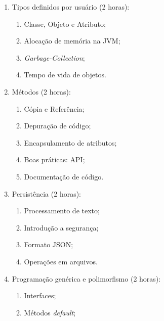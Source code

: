 \documentclass{article}
\begin{document}
\begin{enumerate}
\begin{samepage}
\begin{enumerate}
        \end{enumerate}
        \end{samepage}
    \item Tipos definidos por usuário (2 horas):
        \begin{samepage}
        \begin{enumerate}
                \item Classe, Objeto e Atributo;
                \item Alocação de memória na JVM;
                \item \textit{Garbage-Collection};
                \item Tempo de vida de objetos.
        \end{enumerate}
        \end{samepage}
    \item Métodos (2 horas):
        \begin{samepage}
        \begin{enumerate}
                \item Cópia e Referência;
                \item Depuração de código;
                \item Encapsulamento de atributos;
                \item Boas práticas: API\@;
                \item Documentação de código.
        \end{enumerate}
        \end{samepage}
    \item Persistência (2 horas):
        \begin{samepage}
        \begin{enumerate}
                \item Processamento de texto;
                \item Introdução a segurança;
                \item Formato JSON;
                \item Operações em arquivos.
        \end{enumerate}
        \end{samepage}
    \item Programação genérica e polimorfismo (2 horas):
        \begin{samepage}
        \begin{enumerate}
                \item Interfaces;
                \item Métodos \textit{default};

\end{enumerate}
\end{samepage}
\end{enumerate}
\end{document}
